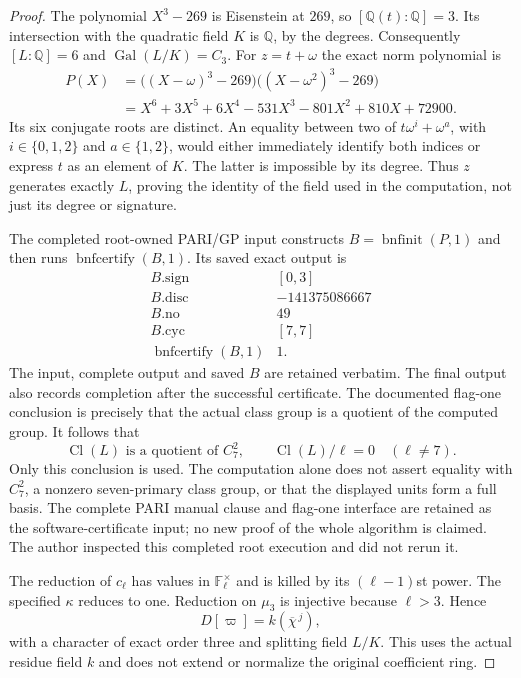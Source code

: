 \begin{proof}
The polynomial $X^3-269$ is Eisenstein at $269$, so
$[\mathbb Q(t):\mathbb Q]=3$.  Its intersection with the quadratic
field $K$ is $\mathbb Q$, by the degrees.  Consequently
$[L:\mathbb Q]=6$ and $\operatorname{Gal}(L/K)=C_3$.
For $z=t+\omega$ the exact norm polynomial is
\[
 \begin{split}
 P(X)&=\bigl((X-\omega)^3-269\bigr)
          \bigl((X-\omega^2)^3-269\bigr)\\
 &=X^6+3X^5+6X^4-531X^3-801X^2+810X+72900.
 \end{split}
 \tag{MCP.7}
\]
Its six conjugate roots are distinct.  An equality between two
of $t\omega^i+\omega^a$, with $i\in\{0,1,2\}$ and $a\in\{1,2\}$,
would either immediately identify both indices or express $t$
as an element of $K$.  The latter is impossible by its degree.
Thus $z$ generates exactly $L$, proving the identity of the field
used in the computation, not just its degree or signature.

The completed root-owned PARI/GP input constructs
$B=\operatorname{bnfinit}(P,1)$ and then runs
$\operatorname{bnfcertify}(B,1)$.  Its saved exact output is
\[
 \begin{array}{c|c}
 B.\mathrm{sign}&[0,3]\\
 B.\mathrm{disc}&-141375086667\\
 B.\mathrm{no}&49\\
 B.\mathrm{cyc}&[7,7]\\
 \operatorname{bnfcertify}(B,1)&1.
 \end{array}
 \tag{MCP.8}
\]
The input, complete output and saved $B$ are retained verbatim.
The final output also records completion after the successful
certificate.  The documented flag-one conclusion is precisely
that the actual class group is a quotient of the computed group.
It follows that
\[
        \operatorname{Cl}(L)\text{ is a quotient of }C_7^2,
        \qquad \operatorname{Cl}(L)/\ell=0\quad(\ell\ne7).
 \tag{MCP.9}
\]
Only this conclusion is used.  The computation alone does not
assert equality with $C_7^2$, a nonzero seven-primary class group,
or that the displayed units form a full basis.  The complete
PARI manual clause and flag-one interface are retained as the
software-certificate input; no new proof of the whole algorithm
is claimed.  The author inspected this completed root execution
and did not rerun it.

The reduction of $c_\ell$ has values in
$\mathbb F_\ell^\times$ and is killed by its $(\ell-1)$st power.
The specified $\kappa$ reduces to one.  Reduction on $\mu_3$
is injective because $\ell>3$.  Hence
\[
                         D[\varpi]=k(\overline\chi^{\,j}),
 \tag{MCP.10}
\]
with a character of exact order three and splitting field $L/K$.
This uses the actual residue field $k$ and does not extend or
normalize the original coefficient ring.


\end{proof}
